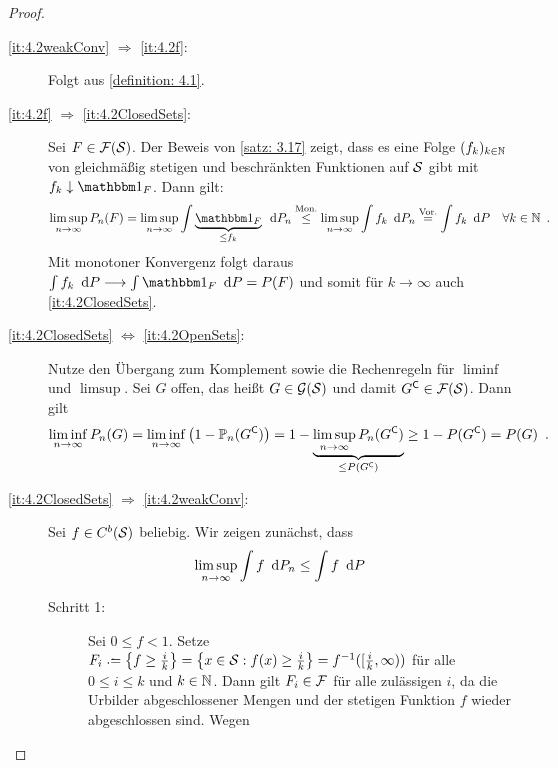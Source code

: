 \begin{proof}
	\begin{description}
		\item[\ref{it:4.2weakConv} $\Rightarrow$ \ref{it:4.2f}:] 
		Folgt aus \cref{definition: 4.1}.
		\item[\ref{it:4.2f} $\Rightarrow$ \ref{it:4.2ClosedSets}:] 
		Sei $F \in\F(\S)$. Der Beweis von \cref{satz: 3.17} zeigt, dass es eine Folge $(f_k)_{k \in \N}$ von gleichmäßig stetigen und beschränkten Funktionen auf $\S$ gibt mit $f_k \downarrow \one_F$. Dann gilt:
		\begin{equation*}
			\limsup_{n \to \infty} P_n(F)
			= \limsup_{n \to \infty} \int \underbrace{\one_F}_{\le f_k} \diffskip P_n
			\overset{\text{Mon.}}{\le}
			\limsup_{n \to \infty} \int f_k \diffskip P_n
			\overset{\text{Vor.}}{=}
			\int f_k \diffskip P \quad \forall k \in \N 
			\satzende
		\end{equation*}
		Mit monotoner Konvergenz folgt daraus $\int f_k \diffskip P \longrightarrow \int \one_F \diffskip  P = P(F)$ und somit für $k \to \infty$ auch \ref{it:4.2ClosedSets}.
		\item[\ref{it:4.2ClosedSets} $\Leftrightarrow$ \ref{it:4.2OpenSets}:]
		Nutze den Übergang zum Komplement sowie die Rechenregeln für $\liminf$ und $\limsup$. Sei $G$ offen, das heißt $G \in \G(\S)$ und damit $G^\complement \in \F(\S)$. Dann gilt
		\begin{equation*}
			\liminf_{n \to \infty} P_n(G)
			= \liminf_{n \to \infty} \brackets{1-\P_n(G^\complement)}
			= 1 - \underbrace{\limsup_{n \to \infty} P_n(G^\complement)}_{\le P(G^\complement)}
			\ge 1 - P(G^\complement)
			= P(G) 
			\satzende
		\end{equation*}
		\item[\ref{it:4.2ClosedSets} $\Rightarrow$ \ref{it:4.2weakConv}:] Sei $f \in C^b(\S)$ beliebig. Wir zeigen zunächst, dass
		\begin{equation}\label{eqProof1.4.2Sternchen}
			\limsup_{n \to \infty} \int f \diffskip P_n \le \int f \diffskip P
		\end{equation}
		\begin{description}
			\item[Schritt 1:] Sei $0 \le f < 1$. Setze $F_i \defeq \menge{ f \ge \frac{i}{k} } = \menge{ x \in \S : f(x) \ge \frac{i}{k} } = f^{-1}([\frac{i}{k}, \infty))$ für alle $0 \le i \le k$ und $k \in \N$.
			Dann gilt $F_i \in \F$ für alle zulässigen $i$, da die Urbilder abgeschlossener Mengen und der stetigen Funktion $f$ wieder abgeschlossen sind. Wegen

\end{description}
\end{description}
\end{proof}
